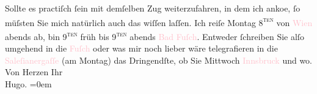                     Sollte es practiſch ſein mit demſelben {\pb}Zug weiterzufahren, in dem
                    ich anko{\geminationm}e, ſo müſsten Sie mich natürlich auch das
                    wiſſen laſſen. Ich reiſe Montag 8\textsc{\textsuperscript{ten}} von \textcolor{pink}{Wien}{}\ledrightnote{\textcolor{pink}{Wien}} abends ab, bin 9\textsc{\textsuperscript{ten}}{ }früh bis 9\textsc{\textsuperscript{ten}}{ }abends{ }\textcolor{pink}{Bad Fuſch}{}\ledrightnote{\textcolor{pink}{Bad Fusch}}. Entweder ſchreiben Sie alſo umgehend
                    in die \textcolor{pink}{Fuſch}{}\ledrightnote{\textcolor{pink}{Bad Fusch}} oder was mir noch lieber wäre {\pb}telegrafieren in die \textcolor{pink}{Saleſianergaſſe}{}\ledrightnote{\textcolor{pink}{Salesianergasse}} (am Montag) das
                    Dringendſte, ob Sie Mittwoch{ }\textcolor{pink}{Innsbruck}{}\ledrightnote{\textcolor{pink}{Innsbruck}} und wo.\pend
           \pstart
           Von Herzen Ihr{\\[\baselineskip]}\spacefill\mbox{Hugo.}\pend
           \leftskip=0em{}\endnumbering{}  
      